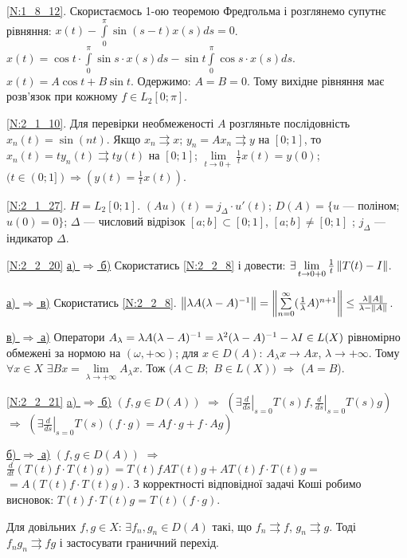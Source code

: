 \noindent\ref{N:1_8_12}. Скористаємось 1-ою теоремою Фредгольма і розглянемо супутнє рівняння: $x(t) - \int\limits_0^{\pi} \sin (s-t)x(s) ds = 0$.
$x(t) = \cos t \cdot \int\limits_0^{\pi} \sin s \cdot x(s) ds - \sin t \int\limits_0^{\pi} \cos s \cdot x(s) ds$. $x(t) = A \cos t + B \sin t$.
Одержимо: $A = B = 0$. Тому вихідне рівняння має розв'язок при кожному $f \in L_2 [0; \pi]$.

\noindent\ref{N:2_1_10}. Для перевірки необмеженості $A$ розгляньте послідовність $x_n (t) = \sin (nt)$.
Якщо $x_n \rightrightarrows x$; $y_n = A x_n \rightrightarrows y$ на $[0; 1]$, то $x_n (t) = t y_n(t) \rightrightarrows t y(t)$
на $[0; 1]$; $\lim\limits_{t \rightarrow 0+} \frac{1}{t} x(t) = y(0)$; $(t \in (0; 1]) \Rightarrow (y(t) = \frac{1}{t} x(t))$.

\noindent\ref{N:2_1_27}. $H = L_2 [0; 1]$. $(A u)(t) = j_{\Delta} \cdot u'(t)$; 
$D(A) = \{u$ --- поліном; $u(0) = 0\}$; $\Delta$ --- числовий відрізок $[a; b] \subset [0; 1]$, $[a; b] \neq [0; 1]$ ; $j_{\Delta}$ --- індикатор $\Delta$.

\noindent\ref{N:2_2_20} \ul{а) $\Rightarrow$ б)} Скористатись \ref{N:2_2_8} і 
довести: $\exists \lim\limits_{t\rightarrow 0+0}\frac{1}{t}\left\lVert T(t) - I\right\rVert$.

\noindent \ul{а) $\Rightarrow$ в)} Скористатись \ref{N:2_2_8}. 
$\left\lVert\lambda A (\lambda - A)^{-1}\right\rVert = \left\lVert\sum\limits_{n=0}^\infty 
(\frac{1}{\lambda}A)^{n+1}\right\rVert \leq \frac{\lambda \left\lVert A\right\rVert}{\lambda - \left\lVert A\right\rVert}$.

\noindent \ul{в) $\Rightarrow$ а)} Оператори $A_\lambda = \lambda A (\lambda - A)^{-1} = 
\lambda^2 (\lambda - A)^{-1} - \lambda I \in L(X)$ рівномірно обмежені за 
нормою на $(\omega, +\infty)$; для $x \in D(A)$: $A_\lambda x \rightarrow 
Ax$, $\lambda \rightarrow +\infty$. Тому $\forall x \in X$ $\exists Bx 
= \lim\limits_{\lambda \rightarrow +\infty} A_\lambda x$. 
Тож $(A \subset B;$ $B \in L(X))$ $\Rightarrow$ ($A = B$).

\noindent\ref{N:2_2_21} \ul{a) $\Rightarrow$ б)} $\left(f, g \in D(A)\right)$ 
$\Rightarrow$ $\left(\exists \left.\frac{d}{ds}\right|_{s=0}T(s)f, 
\left.\frac{d}{ds}\right|_{s=0}T(s)g\right)$ $\Rightarrow$ 
$(\exists \left.\frac{d}{ds}\right|_{s=0}T(s)(f\cdot g) = Af \cdot g + f \cdot Ag)$

\ul{б) $\Rightarrow$ а)} $(f, g\in D(A))$ $\Rightarrow$ $\frac{d}{dt}(T(t)f \cdot T(t)g) = 
T(t)f AT(t)g + AT(t)f\cdot T(t)g =$ $=A(T(t)f\cdot T(t)g)$.
З корректності відповідної задачі Коші робимо висновок:
$T(t)f \cdot T(t)g = T(t)(f \cdot g)$.

Для довільних $f, g \in X$: $\exists f_n, g_n \in D(A)$ такі, що $f_n \rightrightarrows f$, 
$g_n \rightrightarrows g$. Тоді $f_n g_n \rightrightarrows fg$ і застосувати граничний перехід.
